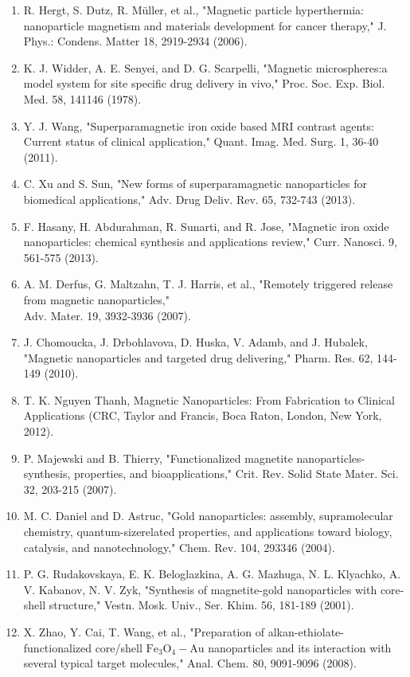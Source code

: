 \documentclass[10pt, a4paper]{article}
\begin{document}
\begin{enumerate}
  \item R. Hergt, S. Dutz, R. Müller, et al., "Magnetic particle hyperthermia: nanoparticle magnetism and materials development for cancer therapy," J. Phys.: Condens. Matter 18, 2919-2934 (2006).
  \item K. J. Widder, A. E. Senyei, and D. G. Scarpelli, "Magnetic microspheres:a model system for site specific drug delivery in vivo," Proc. Soc. Exp. Biol. Med. 58, 141146 (1978).
  \item Y. J. Wang, "Superparamagnetic iron oxide based MRI contrast agents: Current status of clinical application," Quant. Imag. Med. Surg. 1, 36-40 (2011).
  \item C. Xu and S. Sun, "New forms of superparamagnetic nanoparticles for biomedical applications," Adv. Drug Deliv. Rev. 65, 732-743 (2013).
  \item F. Hasany, H. Abdurahman, R. Sunarti, and R. Jose, "Magnetic iron oxide nanoparticles: chemical synthesis and applications review," Curr. Nanosci. 9, 561-575 (2013).
  \item A. M. Derfus, G. Maltzahn, T. J. Harris, et al., "Remotely triggered release from magnetic nanoparticles," \\
  Adv. Mater. 19, 3932-3936 (2007).
  \item J. Chomoucka, J. Drbohlavova, D. Huska, V. Adamb, and J. Hubalek, "Magnetic nanoparticles and targeted drug delivering," Pharm. Res. 62, 144-149 (2010).
  \item T. K. Nguyen Thanh, Magnetic Nanoparticles: From Fabrication to Clinical Applications (CRC, Taylor and Francis, Boca Raton, London, New York, 2012).
  \item P. Majewski and B. Thierry, "Functionalized magnetite nanoparticles-synthesis, properties, and bioapplications," Crit. Rev. Solid State Mater. Sci. 32, 203-215 (2007).
  \item M. C. Daniel and D. Astruc, "Gold nanoparticles: assembly, supramolecular chemistry, quantum-sizerelated properties, and applications toward biology, catalysis, and nanotechnology," Chem. Rev. 104, 293346 (2004).
  \item P. G. Rudakovskaya, E. K. Beloglazkina, A. G. Mazhuga, N. L. Klyachko, A. V. Kabanov, N. V. Zyk, "Synthesis of magnetite-gold nanoparticles with core-shell structure," Vestn. Mosk. Univ., Ser. Khim. 56, 181-189 (2001).
  \item X. Zhao, Y. Cai, T. Wang, et al., "Preparation of alkan-ethiolate-functionalized core/shell \(\mathrm{Fe}_{3} \mathrm{O}_{4}-\mathrm{Au}\) nanoparticles and its interaction with several typical target molecules," Anal. Chem. 80, 9091-9096 (2008).

\end{enumerate}
\end{document}
